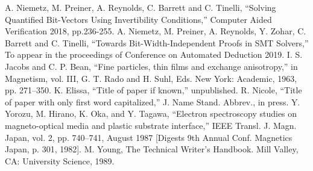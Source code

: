 \documentclass[conference]{IEEEtran}
\begin{document}
\begin{thebibliography}{00}
 A. Niemetz, M. Preiner, A. Reynolds, 
C. Barrett and C. Tinelli, ``Solving Quantified Bit-Vectors 
Using Invertibility Conditions,'' Computer Aided Verification 2018, pp.236-255.
 A. Niemetz, M. Preiner, A. Reynolds, 
Y. Zohar, C. Barrett and C. Tinelli, ``Towards Bit-Width-Independent Proofs in SMT Solvers,'' 
To appear in the proceedings of 
Conference on Automated Deduction 2019.
 I. S. Jacobs and C. P. Bean, ``Fine particles, thin films and exchange anisotropy,'' in Magnetism, vol. III, G. T. Rado and H. Suhl, Eds. New York: Academic, 1963, pp. 271--350.
 K. Elissa, ``Title of paper if known,'' unpublished.
 R. Nicole, ``Title of paper with only first word capitalized,'' J. Name Stand. Abbrev., in press.
 Y. Yorozu, M. Hirano, K. Oka, and Y. Tagawa, ``Electron spectroscopy studies on magneto-optical media and plastic substrate interface,'' IEEE Transl. J. Magn. Japan, vol. 2, pp. 740--741, August 1987 [Digests 9th Annual Conf. Magnetics Japan, p. 301, 1982].
 M. Young, The Technical Writer's Handbook. Mill Valley, CA: University Science, 1989.
\end{thebibliography}
\end{document}
